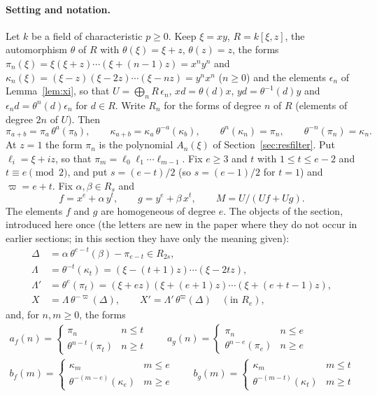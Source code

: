 \documentclass[11pt]{article}
\theoremstyle{definition}
\theoremstyle{remark}
\begin{document}
\paragraph{Setting and notation.} Let $k$ be a field of characteristic $p\ge0$. Keep $\xi=xy$, $R=k[\xi,z]$, the automorphism $\theta$ of $R$ with $\theta(\xi)=\xi+z$, $\theta(z)=z$, the forms $\pi_n(\xi)=\xi(\xi+z)\cdots(\xi+(n-1)z)=x^ny^n$ and $\kappa_n(\xi)=(\xi-z)(\xi-2z)\cdots(\xi-nz)=y^nx^n$ ($n\ge0$) and the elements $\epsilon_n$ of Lemma~\ref{lem:xi}, so that $U=\bigoplus_nR\,\epsilon_n$, $xd=\theta(d)x$, $yd=\theta^{-1}(d)y$ and $\epsilon_nd=\theta^n(d)\epsilon_n$ for $d\in R$. Write $R_n$ for the forms of degree $n$ of $R$ (elements of degree $2n$ of $U$). Then
\[
\pi_{a+b}=\pi_a\,\theta^a(\pi_b),\qquad\kappa_{a+b}=\kappa_a\,\theta^{-a}(\kappa_b),\qquad\theta^n(\kappa_n)=\pi_n,\qquad\theta^{-n}(\pi_n)=\kappa_n .
\]
At $z=1$ the form $\pi_n$ is the polynomial $A_n(\xi)$ of Section~\ref{sec:resfilter}. Put $\ell_i=\xi+iz$, so that $\pi_m=\ell_0\ell_1\cdots\ell_{m-1}$. Fix $e\ge3$ and $t$ with $1\le t\le e-2$ and $t\equiv e\pmod2$, and put $s=(e-t)/2$ (so $s=(e-1)/2$ for $t=1$) and $\varpi=e+t$. Fix $\alpha,\beta\in R_s$ and
\[
f=x^e+\alpha\,y^t,\qquad g=y^e+\beta\,x^t,\qquad M=U/(Uf+Ug).
\]
The elements $f$ and $g$ are homogeneous of degree $e$. The objects of the section, introduced here once (the letters are new in the paper where they do not occur in earlier sections; in this section they have only the meaning given):
\begin{align*}
\Delta&=\alpha\,\theta^{e-t}(\beta)-\pi_{e-t}\in R_{2s},\\
\Lambda&=\theta^{-t}(\kappa_t)=(\xi-(t+1)z)\cdots(\xi-2tz),\\
\Lambda'&=\theta^{e}(\pi_t)=(\xi+ez)(\xi+(e+1)z)\cdots(\xi+(e+t-1)z),\\
X&=\Lambda\,\theta^{-\varpi}(\Delta),\qquad X'=\Lambda'\,\theta^{\varpi}(\Delta)\quad(\text{in }R_e),
\end{align*}
and, for $n,m\ge0$, the forms
\begin{gather*}
a_f(n)=\begin{cases}\pi_n&n\le t\\ \theta^{n-t}(\pi_t)&n\ge t\end{cases}\qquad
a_g(n)=\begin{cases}\pi_n&n\le e\\ \theta^{n-e}(\pi_e)&n\ge e\end{cases}\\
b_f(m)=\begin{cases}\kappa_m&m\le e\\ \theta^{-(m-e)}(\kappa_e)&m\ge e\end{cases}\qquad
b_g(m)=\begin{cases}\kappa_m&m\le t\\ \theta^{-(m-t)}(\kappa_t)&m\ge t\end{cases}
\end{gather*}
\end{document}
